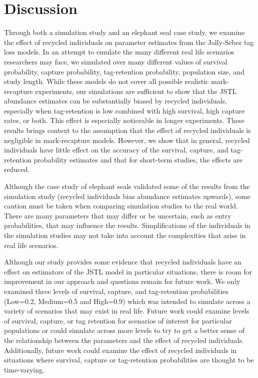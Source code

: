 \documentclass[]{article}
\begin{document}
\section{Discussion}\label{discussion}
Through both a simulation study and an elephant seal case study, we examine the effect of recycled individuals on parameter estimates from the Jolly-Seber tag loss models.
In an attempt to emulate the many different real life scenarios
researchers may face, we simulated over many different values of
survival probability, capture probability, tag-retention probability, population size, and study length. While
these models do not cover all possible realistic mark-recapture
experiments, our simulations are sufficient to show that the JSTL
abundance estimates can be substantially biased by recycled individuals,
especially when tag-retention is low combined with high survival, high
capture rates, or both. This effect is especially noticeable in longer
experiments. These results brings context to the assumption that the effect of
recycled individuals is negligible in mark-recapture models. However, we
show that in general, recycled individuals have little effect on the
accuracy of the survival, capture, and tag-retention probability
estimates and that for short-term studies, the effects are reduced.

Although the case study of elephant seals validated some of the results from
the simulation study (recycled individuals bias abundance estimates
upwards), some caution must be taken when comparing simulation studies
to the real world. There are many parameters that may differ or be
uncertain, such as entry probabilities, that may influence the results.
Simplifications of the individuals in the simulation studies may not
take into account the complexities that arise in real life
scenarios.

Although our study provides some evidence that recycled individuals have
an effect on estimators of the JSTL model in particular situations,
there is room for improvement in our approach and questions remain for
future work. We only examined three levels of survival, capture, and
tag-retention probabilities (Low=0.2, Medium=0.5 and High=0.9) which was
intended to simulate across a variety of scenarios that may exist
in real life. Future work could examine levels of survival, capture, or
tag retention for scenarios of interest for particular populations or
could simulate across more levels to try to get a better sense of the
relationship between the parameters and the effect of recycled
individuals. Additionally, future work could examine the effect of
recycled individuals in situations where survival, capture or
tag-retention probabilities are thought to be time-varying.
\end{document}
